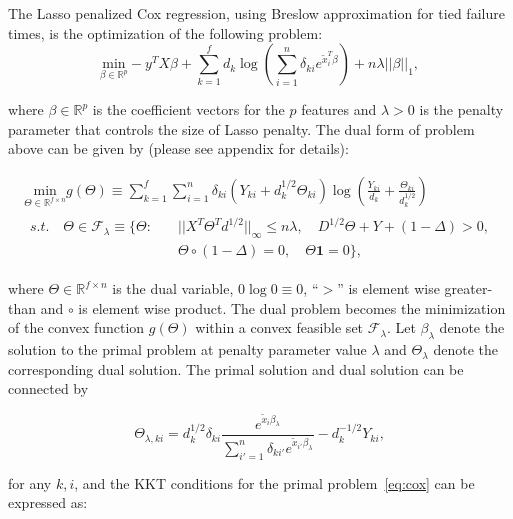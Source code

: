 The Lasso penalized Cox regression, using Breslow approximation \citep{breslow1974covariance} for tied failure times, is the optimization of the following problem:
\begin{equation}
    \label{eq:cox}
    \underset{\beta\in \mathbb{R}^p}{\mathrm{min}}-y^TX\beta+\sum_{k=1}^f d_k\log\left(\sum_{i=1}^n \delta_{ki} e^{\tilde{x}_i^T\beta}\right)+n\lambda||\beta||_1,
\end{equation}

where $\beta\in\mathbb{R}^p$ is the coefficient vectors for the $p$ features and $\lambda>0$ is the penalty parameter that controls the size of Lasso penalty. The dual form of problem above can be given by (please see appendix for details):

\begin{gather}
        \label{eq:dualTheta}
        \underset{\Theta\in \mathbb{R}^{f\times n}}{\mathrm{min}}g(\Theta)\equiv\sum_{k=1}^f\sum_{i=1}^n\delta_{ki}(Y_{ki}+d_k^{1/2}\Theta_{ki})\log\left(\frac{Y_{ki}}{d_k}+\frac{\Theta_{ki}}{d_k^{1/2}}\right)\\
        \begin{aligned}s.t.\quad \Theta\in \mathcal{F}_\lambda\equiv\{\Theta:\quad
            &||X^T\Theta^Td^{1/2}||_\infty\leq n\lambda,\quad D^{1/2}\Theta+Y+(1-\Delta)> 0,\\& \Theta\circ(1-\Delta)=0,\quad \Theta\mathbf{1}=0\}\nonumber,
        \end{aligned}
\end{gather}

where $\Theta\in \mathbb{R}^{f\times n}$ is the dual variable, $0\log 0\equiv0$, ``$>$'' is element wise greater-than and $\circ$ is element wise product. The dual problem becomes the minimization of the convex function $g(\Theta)$ within a convex feasible set $\mathcal{F}_\lambda$. Let $\beta_\lambda$ denote the solution to the primal problem at penalty parameter value $\lambda$ and $\Theta_{\lambda}$ denote the corresponding dual solution. The primal solution and dual solution can be connected by

\begin{equation}
    \label{eq:dualprimal}
    \Theta_{\lambda,ki}=d_k^{1/2}\delta_{ki}\frac{e^{\tilde{x}_i\beta_\lambda}}{\sum_{i'=1}^n\delta_{ki'}e^{\tilde{x}_{i'}\beta_\lambda}}-d_k^{-1/2}Y_{ki},
\end{equation}

for any $k,i$, and the KKT conditions for the primal problem~\eqref{eq:cox} can be expressed as:

